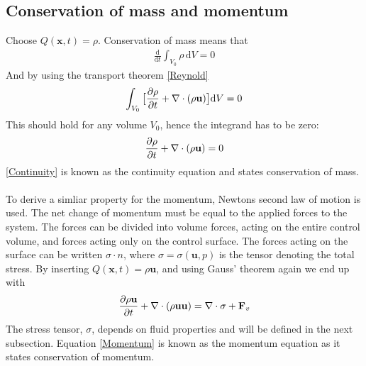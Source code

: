 \subsection{Conservation of mass and momentum}
Choose $Q(\mathbf{x},t) = \rho$. Conservation of mass means that
\begin{align*} 
\frac{\mathrm{d}}{\mathrm{d}t} \int_{V_0} \rho \, \mathrm{d}V = 0
\end{align*}
And by using the transport theorem \eqref{Reynold}
\begin{align}
\int_{V_0} \big{[}\frac{\partial \rho}{\partial t} + \nabla \cdot (\rho \mathbf{u}) \big{]}\mathrm{d}V = 0
\end{align}
This should hold for any volume $V_0$, hence the integrand has to be zero:
\begin{align} 
\frac{\partial \rho}{\partial t} + \nabla \cdot (\rho \mathbf{u}) = 0 \label{Continuity}
\end{align}
\eqref{Continuity} is known as the continuity equation and states conservation of mass. 
\\
\\
To derive a simliar property for the momentum, Newtons second law of motion is used. The net change of momentum must be equal to the applied forces to the system. The forces can be divided into volume forces, acting on the entire control volume, and forces acting only on the control surface. The forces acting on the surface can be written $\sigma \cdot n$, where $\sigma = \sigma(\mathbf{u}, p)$ is the tensor denoting the total stress. By inserting $Q(\mathbf{x},t) = \rho \mathbf{u} $, and using Gauss' theorem again we end up with
\begin{align}
\frac{\partial \rho \mathbf{u}}{\partial t} + \nabla \cdot (\rho \mathbf{u}\mathbf{u} ) = \nabla \cdot \sigma + \mathbf{F}_v \label{Momentum}
\end{align} 
The stress tensor, $\sigma$, depends on fluid properties and will be defined in the next subsection. Equation \eqref{Momentum} is known as the momentum equation as it states conservation of momentum.


